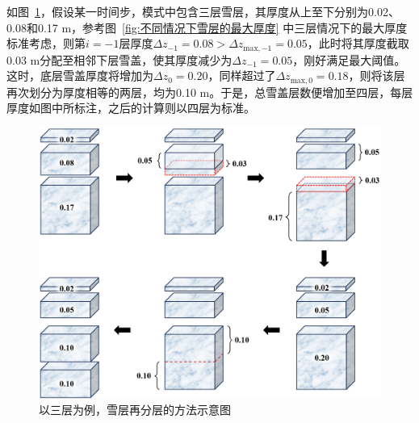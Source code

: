 如图~\ref{fig:以三层为例雪层再分层的方法}，假设某一时间步，模式中包含三层雪层，其厚度从上至下分别为0.02、0.08和0.17 m，参考图~\ref{fig:不同情况下雪层的最大厚度} 中三层情况下的最大厚度标准考虑，则第$i=-1$层厚度$\Delta z_{-1}=0.08 > \Delta z_{\mathrm{max,-1}}=0.05 $，此时将其厚度截取0.03 m分配至相邻下层雪盖，使其厚度减少为$\Delta z_{-1}=0.05$，刚好满足最大阈值。这时，底层雪盖厚度将增加为$\Delta z_{0}=0.20$，同样超过了$\Delta z_{\mathrm{max,0}}=0.18$，则将该层再次划分为厚度相等的两层，均为0.10 m。于是，总雪盖层数便增加至四层，每层厚度如图中所标注，之后的计算则以四层为标准。

{
  \begin{figure}[htbp]
    \centering
    \includegraphics[width=0.8\columnwidth]{Figures/雪盖土壤热力过程/以三层为例雪层再分层的方法.png}
    \caption{以三层为例，雪层再分层的方法示意图}
    \label{fig:以三层为例雪层再分层的方法}
  \end{figure}
}
